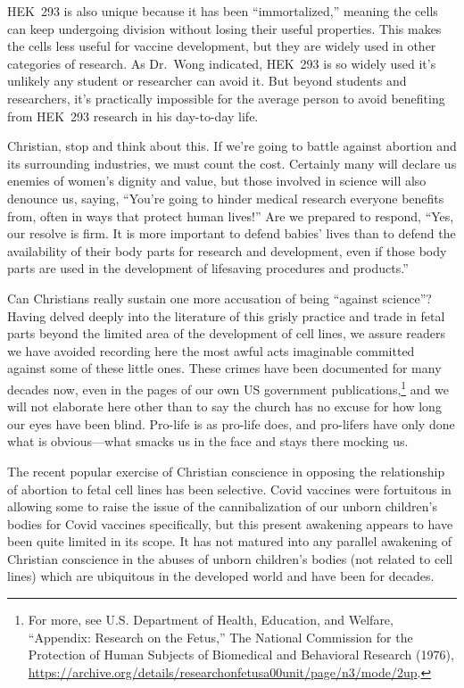 \documentclass[
]{book}
\begin{document}
HEK~293 is also unique because it has been ``immortalized,'' meaning the cells can keep undergoing division without losing their useful properties. This makes the cells less useful for vaccine development, but they are widely used in other categories of research. As Dr.~Wong indicated, HEK~293 is so widely used it's unlikely any student or researcher can avoid it. But beyond students and researchers, it's practically impossible for the average person to avoid benefiting from HEK~293 research in his day-to-day life.

Christian, stop and think about this. If we're going to battle against abortion and its surrounding industries, we must count the cost. Certainly many will declare us enemies of women's dignity and value, but those involved in science will also denounce us, saying, ``You're going to hinder medical research everyone benefits from, often in ways that protect human lives!'' Are we prepared to respond, ``Yes, our resolve is firm. It is more important to defend babies' lives than to defend the availability of their body parts for research and development, even if those body parts are used in the development of lifesaving procedures and products.''

Can Christians really sustain one more accusation of being ``against science''? Having delved deeply into the literature of this grisly practice and trade in fetal parts beyond the limited area of the development of cell lines, we assure readers we have avoided recording here the most awful acts imaginable committed against some of these little ones. These crimes have been documented for many decades now, even in the pages of our own US government publications,\footnote{For more, see U.S. Department of Health, Education, and Welfare, ``Appendix: Research on the Fetus,'' The National Commission for the Protection of Human Subjects of Biomedical and Behavioral Research (1976), \url{https://archive.org/details/researchonfetusa00unit/page/n3/mode/2up}.} and we will not elaborate here other than to say the church has no excuse for how long our eyes have been blind. Pro-life is as pro-life does, and pro-lifers have only done what is obvious---what smacks us in the face and stays there mocking us.

The recent popular exercise of Christian conscience in opposing the relationship of abortion to fetal cell lines has been selective. Covid vaccines were fortuitous in allowing some to raise the issue of the cannibalization of our unborn children's bodies for Covid vaccines specifically, but this present awakening appears to have been quite limited in its scope. It has not matured into any parallel awakening of Christian conscience in the abuses of unborn children's bodies (not related to cell lines) which are ubiquitous in the developed world and have been for decades.
\end{document}
